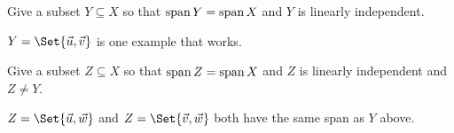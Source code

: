 	\begin{parts}[resume]
		\item Give a subset $Y\subseteq X$ so that $\operatorname{span} Y=\operatorname{span} X$ and $Y$ is
			linearly independent.
			\begin{solution}
				$Y = \Set{\vec u,\vec v}$ is one example that works.
			\end{solution}
		\item Give a subset $Z\subseteq X$ so that $\operatorname{span} Z=\operatorname{span} X$ and $Z$ is
			linearly independent and $Z\neq Y$.
			\begin{solution}
				$Z = \Set{\vec u, \vec w}$ and $Z = \Set{\vec v, \vec w}$ both have
				the same span as $Y$ above.
			\end{solution}
	\end{parts}


	\bookonlynewpage

